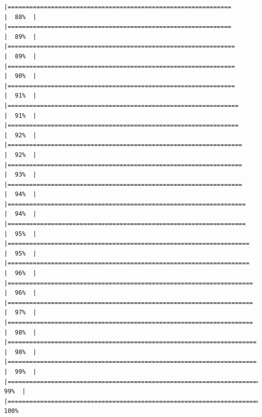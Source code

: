 \documentclass[
]{article}
\begin{document}
\begin{verbatim}
|==============================================================        |  88%  |                                                                              |==============================================================        |  89%  |                                                                              |===============================================================       |  89%  |                                                                              |===============================================================       |  90%  |                                                                              |===============================================================       |  91%  |                                                                              |================================================================      |  91%  |                                                                              |================================================================      |  92%  |                                                                              |=================================================================     |  92%  |                                                                              |=================================================================     |  93%  |                                                                              |=================================================================     |  94%  |                                                                              |==================================================================    |  94%  |                                                                              |==================================================================    |  95%  |                                                                              |===================================================================   |  95%  |                                                                              |===================================================================   |  96%  |                                                                              |====================================================================  |  96%  |                                                                              |====================================================================  |  97%  |                                                                              |====================================================================  |  98%  |                                                                              |===================================================================== |  98%  |                                                                              |===================================================================== |  99%  |                                                                              |======================================================================|  99%  |                                                                              |======================================================================| 100%

\end{verbatim}
\end{document}
